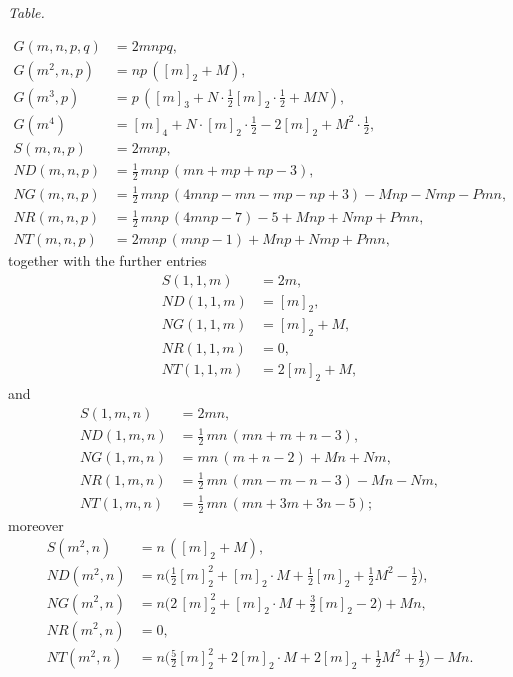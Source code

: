 \documentclass[11pt,a4paper]{article}
\begin{document}
\begin{center}
\textit{Table.}
\end{center}
\[
\begin{aligned}
G(m, n, p, q) &= 2mnpq,\\
G(m^2, n, p) &= np\,([m]_2 + M),\\
G(m^3, p) &= p\,([m]_3 + N \cdot \tfrac{1}{2}[m]_2 \cdot \tfrac{1}{2} + MN),\\
G(m^4) &= [m]_4 + N \cdot [m]_2 \cdot \tfrac{1}{2} - 2[m]_2 + M^2 \cdot \tfrac{1}{2},\\
S(m, n, p) &= 2mnp,\\
ND(m, n, p) &= \tfrac{1}{2}\,mnp\,(mn + mp + np - 3),\\
NG(m, n, p) &= \tfrac{1}{2}\,mnp\,(4mnp - mn - mp - np + 3) - Mnp - Nmp - Pmn,\\
NR(m, n, p) &= \tfrac{1}{2}\,mnp\,(4mnp - 7) - 5 + Mnp + Nmp + Pmn,\\
NT(m, n, p) &= 2mnp\,(mnp - 1) + Mnp + Nmp + Pmn,
\end{aligned}
\]
together with the further entries
\[
\begin{aligned}
S(1, 1, m) &= 2m,\\
ND(1, 1, m) &= [m]_2,\\
NG(1, 1, m) &= [m]_2 + M,\\
NR(1, 1, m) &= 0,\\
NT(1, 1, m) &= 2[m]_2 + M,
\end{aligned}
\]
and
\[
\begin{aligned}
S(1, m, n) &= 2mn,\\
ND(1, m, n) &= \tfrac{1}{2}\,mn\,(mn + m + n - 3),\\
NG(1, m, n) &= mn\,(m + n - 2) + Mn + Nm,\\
NR(1, m, n) &= \tfrac{1}{2}\,mn\,(mn - m - n - 3) - Mn - Nm,\\
NT(1, m, n) &= \tfrac{1}{2}\,mn\,(mn + 3m + 3n - 5);
\end{aligned}
\]
moreover
\[
\begin{aligned}
S(m^2, n) &= n\,([m]_2 + M),\\
ND(m^2, n) &= n\bigl(\tfrac{1}{2}[m]_2^2 + [m]_2 \cdot M + \tfrac{1}{2}[m]_2 + \tfrac{1}{2}M^2 - \tfrac{1}{2}\bigr),\\
NG(m^2, n) &= n\bigl(2\,[m]_2^2 + [m]_2 \cdot M + \tfrac{3}{2}[m]_2 - 2\bigr) + Mn,\\
NR(m^2, n) &= 0,\\
NT(m^2, n) &= n\bigl(\tfrac{5}{2}[m]_2^2 + 2[m]_2 \cdot M + 2[m]_2 + \tfrac{1}{2}M^2 + \tfrac{1}{2}\bigr) - Mn.
\end{aligned}
\]
\end{document}
